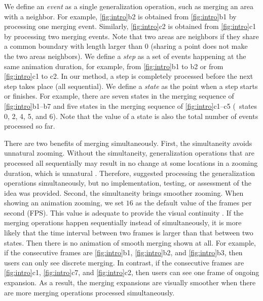 \documentclass[twocolumn]{svjour3}          %
\begin{document}
We define an \emph{event} as a single generalization operation, 
such as merging an area with a neighbor.
For example, \fig\ref{fig:intro}b2 is obtained from 
\fig\ref{fig:intro}b1 by processing one merging event.
Similarly, \fig\ref{fig:intro}c2 is obtained from 
\fig\ref{fig:intro}c1 by processing two merging events.
Note that two areas are neighbors if 
they share a common boundary with length larger than 0
(sharing a point does not make the two areas neighbors).
We define a \emph{step} as 
a set of events happening at the same animation duration,
for example, from \fig\ref{fig:intro}b1 to b2 or
from \fig\ref{fig:intro}c1 to c2.
In our method, a step is completely processed 
before the next step takes place (all sequential).
We define a \emph{state} as the point when a step starts or finishes.
For example, there are seven states 
in the merging sequence of \figs\ref{fig:intro}b1--b7
and five states in the merging sequence of \figs\ref{fig:intro}c1--c5 
(\ie~states 0, 2, 4, 5, and 6).
Note that the value of a state is also 
the total number of events processed so far.


There are two benefits of merging simultaneously.
First, the simultaneity avoids unnatural zooming.
Without the simultaneity,
generalization operations that are processed all sequentially 
may result in no change at some locations in a zooming duration, 
which is unnatural \citep{vanOosterom2014Support}. 
Therefore, \citet{vanOosterom2014Support} 
suggested processing the generalization operations simultaneously,
but no implementation, testing, or assessment of the idea was provided.
Second, the simultaneity brings smoother zooming.
When showing an animation zooming, 
we set $16$ as the default value of the frames per second (FPS).
This value is adequate to provide the visual continuity
\citep[]{Read2000Film}.
If the merging operations happen sequentially instead of simultaneously,
it is more likely that
the time interval between two frames is larger than that between two states.
Then there is no animation of smooth merging shown at all.
For example, if the consecutive frames are 
\figs\ref{fig:intro}b1, \ref{fig:intro}b2, and \ref{fig:intro}b3,
then users can only see discrete merging.
In contrast, if the consecutive frames are 
\figs\ref{fig:intro}c1, \ref{fig:intro}c7, and \ref{fig:intro}c2,
then users can see one frame of ongoing expansion. 
As a result, the merging expansions are visually smoother 
when there are more merging operations processed simultaneously.
\end{document}
